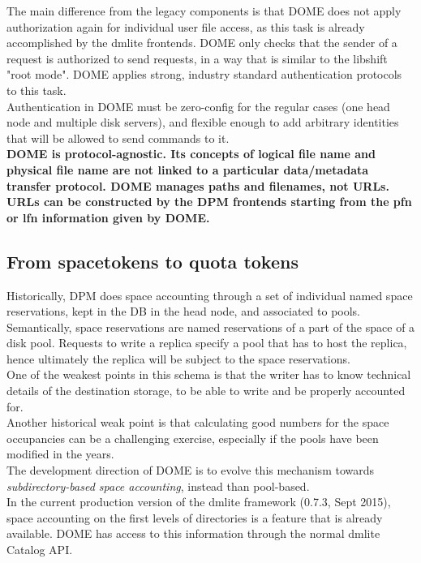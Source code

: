 \documentclass[a4paper,10pt]{scrreprt}
\begin{document}
The main difference from the legacy components is that DOME does not apply authorization again for individual user file
access, as this task is already accomplished by the dmlite frontends. DOME only checks that the sender of a request is authorized to
send requests, in a way that is similar to the libshift "root mode". DOME applies strong, industry standard authentication protocols to this task.\\
Authentication in DOME must be zero-config for the regular cases (one head node and multiple disk servers), and flexible enough to add arbitrary identities that will be allowed to send commands to it.\\
\textbf{DOME is protocol-agnostic. Its concepts of logical file name and physical file name are not linked to a particular data/metadata transfer protocol.
DOME manages paths and filenames, not URLs. URLs can be constructed by the DPM frontends starting from the pfn or lfn information given by DOME.}


\subsection{From spacetokens to quota tokens}
Historically, DPM does space accounting through a set of individual named space reservations, kept in the DB in the head node, and associated to pools.\\
Semantically, space reservations are named reservations of a part of the space of a disk pool. Requests to write a replica specify a pool
that has to host the replica, hence ultimately the replica will be subject to the space reservations.\\
One of the weakest points in this schema is that the writer has to know technical details of the destination storage, to be able to write
and be properly accounted for.\\
Another historical weak point is that calculating good numbers for the space occupancies can be a challenging exercise, especially if the pools have been modified in the years.\\
The development direction of DOME is to evolve this mechanism towards \textit{subdirectory-based space accounting}, instead than pool-based.\\

In the current production version of the dmlite framework (0.7.3, Sept 2015), space accounting on the first levels of directories
is a feature that is already available. DOME has access to this information through the normal dmlite Catalog API.\\
\end{document}
